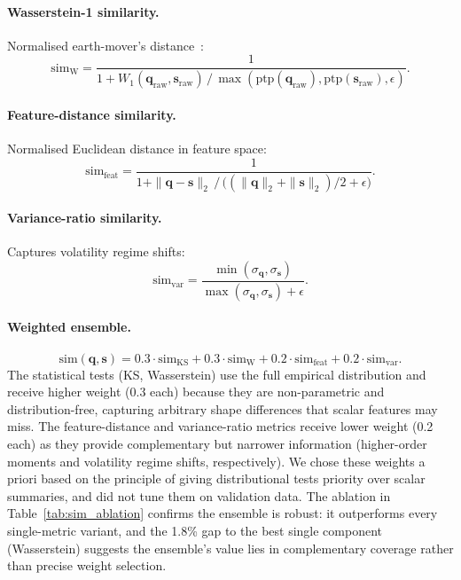 \documentclass[journal]{IEEEtran}
\begin{document}
\paragraph{Wasserstein-1 similarity.} Normalised earth-mover's distance~\cite{villani2009optimal}:
\begin{equation}
  \text{sim}_{\text{W}} = \frac{1}{1 + W_1(\mathbf{q}_{\text{raw}}, \mathbf{s}_{\text{raw}}) \,/\, \max(\text{ptp}(\mathbf{q}_{\text{raw}}), \text{ptp}(\mathbf{s}_{\text{raw}}), \epsilon)}.
\end{equation}

\paragraph{Feature-distance similarity.} Normalised Euclidean distance in feature space:
\begin{equation}
  \text{sim}_{\text{feat}} = \frac{1}{1 + \|\mathbf{q} - \mathbf{s}\|_2 \,/\, \big((\|\mathbf{q}\|_2 + \|\mathbf{s}\|_2)/2 + \epsilon\big)}.
\end{equation}

\paragraph{Variance-ratio similarity.} Captures volatility regime shifts:
\begin{equation}
  \text{sim}_{\text{var}} = \frac{\min(\sigma_{\mathbf{q}}, \sigma_{\mathbf{s}})}{\max(\sigma_{\mathbf{q}}, \sigma_{\mathbf{s}}) + \epsilon}.
\end{equation}

\paragraph{Weighted ensemble.}
\begin{equation}
  \text{sim}(\mathbf{q}, \mathbf{s}) = 0.3 \cdot \text{sim}_{\text{KS}} + 0.3 \cdot \text{sim}_{\text{W}} + 0.2 \cdot \text{sim}_{\text{feat}} + 0.2 \cdot \text{sim}_{\text{var}}.
  \label{eq:ensemble}
\end{equation}
The statistical tests (KS, Wasserstein) use the full empirical distribution and receive higher weight (0.3 each) because they are non-parametric and distribution-free, capturing arbitrary shape differences that scalar features may miss. The feature-distance and variance-ratio metrics receive lower weight (0.2 each) as they provide complementary but narrower information (higher-order moments and volatility regime shifts, respectively). We chose these weights a priori based on the principle of giving distributional tests priority over scalar summaries, and did not tune them on validation data. The ablation in Table~\ref{tab:sim_ablation} confirms the ensemble is robust: it outperforms every single-metric variant, and the 1.8\% gap to the best single component (Wasserstein) suggests the ensemble's value lies in complementary coverage rather than precise weight selection.
\end{document}

